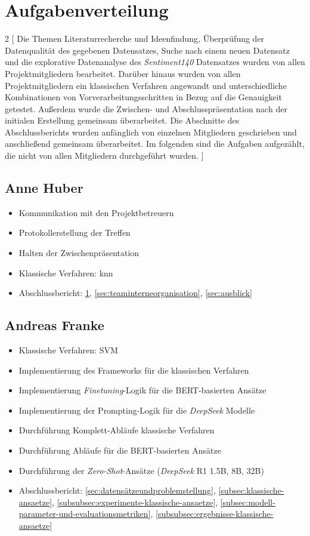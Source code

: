 \section{Aufgabenverteilung}\label{sec:aufgabenverteilung}

\begin{multicols}{2}
[
Die Themen Literaturrecherche und Ideenfindung, Überprüfung der Datenqualität des gegebenen Datensatzes, Suche nach einem neuen Datensatz und die explorative Datenanalyse des \textit{Sentiment140} Datensatzes wurden von allen Projektmitgliedern bearbeitet.
Darüber hinaus wurden von allen Projektmitgliedern ein klassischen Verfahren angewandt und unterschiedliche Kombinationen von Vorverarbeitungsschritten in Bezug auf die Genauigkeit getestet.
Außerdem wurde die Zwischen- und Abschlusspräsentation nach der initialen Erstellung gemeinsam überarbeitet.
Die Abschnitte des Abschlussberichts wurden anfänglich von einzelnen Mitgliedern geschrieben und anschließend gemeinsam überarbeitet.
Im folgenden sind die Aufgaben aufgezählt, die nicht von allen Mitgliedern durchgeführt wurden.
]

\subsection{Anne Huber}
\begin{itemize}
    \item Kommunikation mit den Projektbetreuern
    \item Protokollerstellung der Treffen
    \item Halten der Zwischenpräsentation
    \item Klassische Verfahren: \gls{knn}
    \item Abschlussbericht: \ref{sec:aufgabenverteilung}, \ref{sec:teaminterneorganisation}, \ref{sec:ausblick}
\end{itemize}


\subsection{Andreas Franke}
\begin{itemize}
    \item Klassische Verfahren: SVM
    \item Implementierung des Frameworks für die klassischen Verfahren
    \item Implementierung \textit{Finetuning}-Logik für die BERT-basierten Ansätze
    \item Implementierung der Prompting-Logik für die \textit{DeepSeek} Modelle
    \item Durchführung Komplett-Abläufe klassische Verfahren
    \item Durchführung Abläufe für die BERT-basierten Ansätze
    \item Durchführung der \textit{Zero-Shot}-Ansätze (\textit{DeepSeek} R1 1.5B, 8B, 32B)
    \item Abschlussbericht: \ref{sec:datensätzeundproblemstellung}, \ref{subsec:klassische-ansaetze}, \ref{subsubsec:experimente-klassische-ansaetze}, \ref{subsec:modell-parameter-und-evaluationsmetriken}, \ref{subsubsec:ergebnisse-klassische-ansaetze}
\end{itemize}


\end{multicols}
